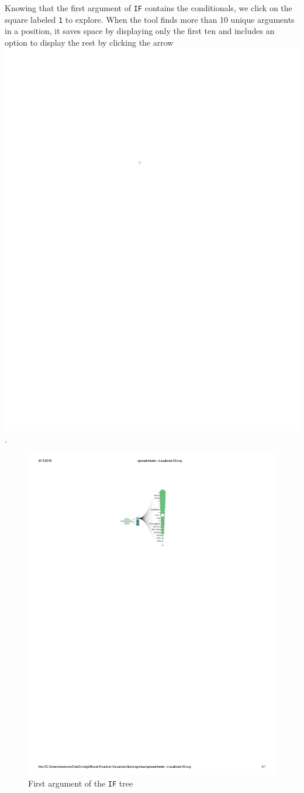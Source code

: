 \documentclass[conference]{IEEEtran}
\begin{document}
	Knowing that the first argument of \texttt{IF} contains the conditionals, we click on
	the square labeled \texttt{1} to explore. When the tool finds more than 10 unique
	arguments in a position, it saves space by displaying only the first ten and
	includes an option to display the rest by clicking the arrow
	\includegraphics{glossary-arrow}.
	
	\begin{figure}[h] \centering \includegraphics[width=0.7\columnwidth]{IFexpand}
		\caption{First argument of the \texttt{IF} tree} \label{fig:expandif} \end{figure}
	
\end{document}
